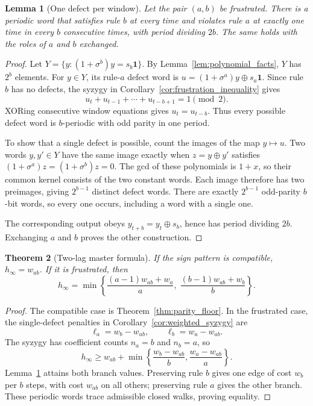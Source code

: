 \documentclass[11pt,a4paper]{article}
\newtheorem{theorem}{Theorem}
\newtheorem{lemma}[theorem]{Lemma}
\begin{document}
\begin{lemma}[One defect per window]
\label{lem:one_defect}
Let the pair $(a,b)$ be frustrated.  There is a periodic word that
satisfies rule $b$ at every time and violates rule $a$ at exactly one
time in every $b$ consecutive times, with period dividing $2b$.
The same holds with the roles
of $a$ and $b$ exchanged.
\end{lemma}

\begin{proof}
Let $Y=\{y:(1+\sigma^b)y=s_b\mathbf1\}$.  By
Lemma~\ref{lem:polynomial_facts}, $Y$ has $2^b$ elements.
For $y\in Y$, its rule-$a$ defect word is
$u=(1+\sigma^a)y\oplus s_a\mathbf1$.
Since rule $b$ has no defects, the syzygy in
Corollary~\ref{cor:frustration_inequality} gives
\[
    u_t+u_{t-1}+\cdots+u_{t-b+1}=1\pmod2.
\]
XORing consecutive window equations gives $u_t=u_{t-b}$.
Thus every possible defect word is $b$-periodic with odd parity
in one period.

To show that a single defect is possible, count the images of the
map $y\mapsto u$.  Two words $y,y'\in Y$ have the same image
exactly when $z=y\oplus y'$ satisfies
$(1+\sigma^a)z=(1+\sigma^b)z=0$.
The gcd of these polynomials is $1+x$, so their common kernel
consists of the two constant words.  Each image therefore has two
preimages, giving $2^{b-1}$ distinct defect words.  There are exactly
$2^{b-1}$ odd-parity $b$-bit words, so every one occurs, including
a word with a single one.

The corresponding output obeys $y_{t+b}=y_t\oplus s_b$, hence
has period dividing $2b$.  Exchanging $a$ and $b$ proves the other
construction.
\end{proof}

\begin{theorem}[Two-lag master formula]
\label{thm:two_lag_master}
If the sign pattern is compatible, $h_\infty=w_{ab}$.  If it is
frustrated, then
\begin{equation}
\label{eq:two_lag_master}
    h_\infty
    =\min\left\{
        \frac{(a-1)w_{ab}+w_a}{a},\;
        \frac{(b-1)w_{ab}+w_b}{b}
      \right\}.
\end{equation}
\end{theorem}

\begin{proof}
The compatible case is Theorem~\ref{thm:parity_floor}.
In the frustrated case, the single-defect penalties in
Corollary~\ref{cor:weighted_syzygy} are
\[
    \ell_a=w_b-w_{ab},\qquad \ell_b=w_a-w_{ab}.
\]
The syzygy has coefficient counts $n_a=b$ and $n_b=a$, so
\[
    h_\infty\ge w_{ab}+
    \min\left\{\frac{w_b-w_{ab}}b,\frac{w_a-w_{ab}}a\right\}.
\]
Lemma~\ref{lem:one_defect} attains both branch values.  Preserving
rule $b$ gives one edge of cost $w_b$ per $b$ steps, with cost
$w_{ab}$ on all others; preserving rule $a$ gives the other branch.
These periodic words trace admissible closed walks, proving equality.
\end{proof}
\end{document}
